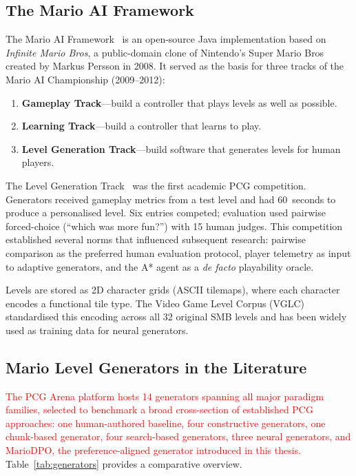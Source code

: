 \documentclass[shortabstract, mgr, english]{iithesis}
\newcommand{\changed}[1]{\textcolor{red}{#1}}
\begin{document}
\subsection{The Mario AI Framework}
\label{subsec:bg-mario-framework}

The Mario AI Framework~\citep{karakovskiy2012marioai} is an open-source Java
implementation based on \emph{Infinite Mario Bros}, a public-domain clone of
Nintendo's Super Mario Bros created by Markus Persson in 2008. It served as the
basis for three tracks of the Mario AI Championship (2009--2012):

\begin{enumerate}[nosep]
    \item \textbf{Gameplay Track}---build a controller that plays levels as well
          as possible.
    \item \textbf{Learning Track}---build a controller that learns to play.
    \item \textbf{Level Generation Track}---build software that generates levels
          for human players.
\end{enumerate}

The Level Generation Track~\citep{shaker2011mario} was the first academic PCG
competition. Generators received gameplay metrics from a test level and had
60~seconds to produce a personalised level. Six entries competed; evaluation used
pairwise forced-choice (``which was more fun?'') with 15 human judges. This
competition established several norms that influenced subsequent research:
pairwise comparison as the preferred human evaluation protocol, player telemetry
as input to adaptive generators, and the A* agent as a \emph{de facto}
playability oracle.

Levels are stored as 2D character grids (ASCII tilemaps), where each character
encodes a functional tile type. The Video Game Level Corpus
(VGLC)~\citep{summerville2016super} standardised this encoding across all 32
original SMB levels and has been widely used as training data for neural
generators.

\subsection{Mario Level Generators in the Literature}
\label{subsec:bg-mario-generators}

\changed{The PCG Arena platform hosts 14 generators spanning all major paradigm
families, selected to benchmark a broad cross-section of established PCG
approaches: one human-authored baseline, four constructive generators, one
chunk-based generator, four search-based generators, three neural generators,
and MarioDPO, the preference-aligned generator introduced in this thesis.}
Table~\ref{tab:generators} provides a comparative overview.
\end{document}
